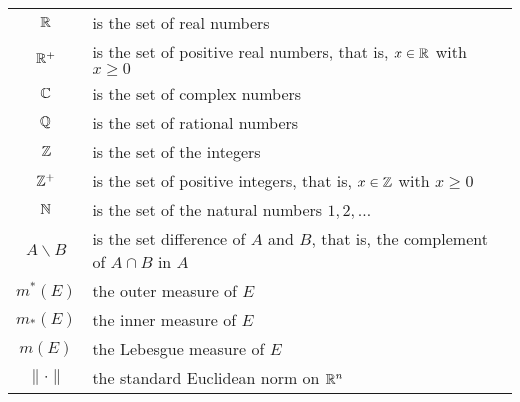 \begin{tabular}{cl}
  $\mathbb{R}$ & is the set of real numbers\\
  $\mathbb{R}^+$ & is the set of positive real numbers, that is, $x\in\mathbb{R}$ with
             $x\geq 0$\\
  $\mathbb{C}$ & is the set of complex numbers\\
  $\mathbb{Q}$ & is the set of rational numbers\\
  $\mathbb{Z}$ & is the set of the integers\\
  $\mathbb{Z}^+$ & is the set of positive integers, that is, $x\in\mathbb{Z}$ with
             $x\geq 0$\\
  $\mathbb{N}$ & is the set of the natural numbers $1,2,\dotsc$\\
  $A\smallsetminus B$ & is the set difference of $A$ and $B$, that is, the
                        complement of $A\cap B$ in $A$\\
  $m^*(E)$ & the outer measure of $E$\\
  $m_*(E)$ & the inner measure of $E$\\
  $m(E)$ & the Lebesgue measure of $E$\\
  $\|\cdot\|$ & the standard Euclidean norm on $\mathbb{R}^n$
\end{tabular}

\newpage

